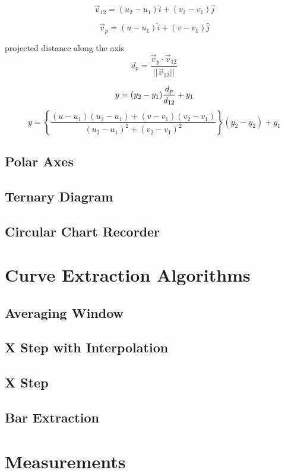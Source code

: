 \documentclass[letterpaper, 11pt]{article}
\begin{document}
\begin{equation}
\vec v_{12} = (u_2-u_1)\hat i + (v_2 - v_1) \hat j
\end{equation}

\begin{equation}
\vec v_p = (u-u_1)\hat i + (v - v_1) \hat j
\end{equation}

projected distance along the axis
\begin{equation}
d_p = \frac{\vec v_p \cdot \vec v_{12}}{|| \vec v_{12} ||}
\end{equation}

\begin{equation}
y = (y_2 - y_1) \frac{d_p}{d_{12}} + y_1 \\
\end{equation}
\begin{equation}
y = \left\{\frac{(u - u_1)(u_2 - u_1) + (v - v_1)(v_2 - v_1)}{(u_2 - u_1)^2 + (v_2 - v_1)^2}\right\}(y_2 - y_2) + y_1
\end{equation}

\subsection{Polar Axes}
\subsection{Ternary Diagram}
\subsection{Circular Chart Recorder}

\section{Curve Extraction Algorithms}

\subsection{Averaging Window}
\subsection{X Step with Interpolation}
\subsection{X Step}
\subsection{Bar Extraction}

\section{Measurements}
\end{document}
